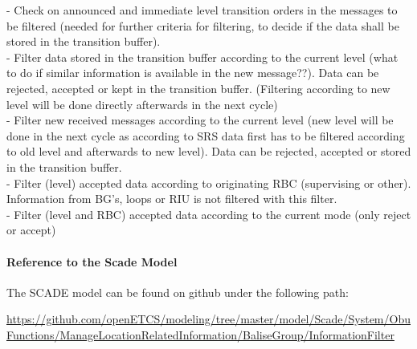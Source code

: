 - Check on announced and immediate level transition orders in the messages to be filtered (needed for further criteria for filtering, to decide if the data shall be stored in the transition buffer).\\
- Filter data stored in the transition buffer according to the current level (what to do if similar information is available in the new message??). Data can be rejected, accepted or kept in the transition buffer.
(Filtering according to new level will be done directly afterwards in the next cycle)\\
- Filter new received messages according to the current level (new level will be done in the next cycle as according to \gls{SRS} data first has to be filtered according to old level and afterwards to new level). Data can be rejected, accepted or stored in the transition buffer.\\
- Filter (level) accepted data according to originating RBC (supervising or other). Information from \gls{BG}'s, loops or RIU is not filtered with this filter.\\
- Filter (level and RBC) accepted data according to the current mode (only reject or accept)\\
\paragraph{Reference to the Scade Model}
The SCADE model can be found on github under the following path:

\tiny\url{https://github.com/openETCS/modeling/tree/master/model/Scade/System/ObuFunctions/ManageLocationRelatedInformation/BaliseGroup/InformationFilter}
\normalsize